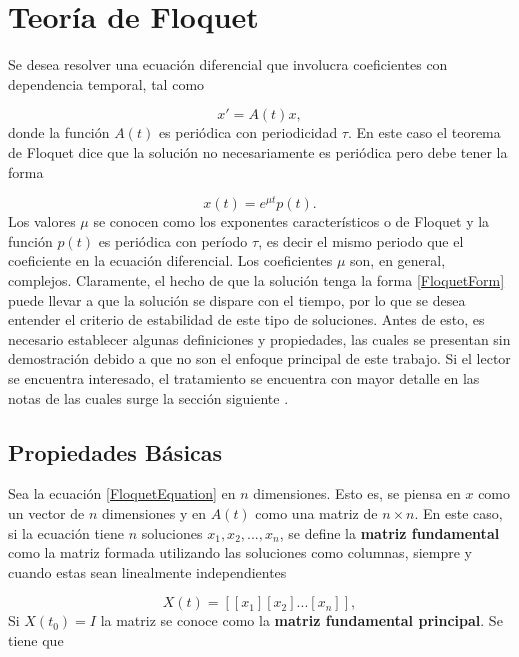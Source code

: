 \documentclass[10pt,a4paper]{report}
\begin{document}
\section{Teoría de Floquet}

Se desea resolver una ecuación diferencial que involucra coeficientes con dependencia temporal, tal como

\begin{equation}\label{FloquetEquation}
x' = A(t)x,
\end{equation} donde la función $A(t)$ es periódica con periodicidad $\tau$. En este caso el teorema de Floquet\cite{WardFT} dice que la solución no necesariamente es periódica pero debe tener la forma

\begin{equation}\label{FloquetForm}
x(t)=e^{\mu t}p(t).
\end{equation} Los valores $\mu$ se conocen como los exponentes característicos o de Floquet y la función $p(t)$ es periódica con período $\tau$, es decir el mismo periodo que el coeficiente en la ecuación diferencial. Los coeficientes $\mu$ son, en general, complejos. Claramente, el hecho de que la solución tenga la forma \eqref{FloquetForm} puede llevar a que la solución se dispare con el tiempo, por lo que se desea entender el criterio de estabilidad de este tipo de soluciones. Antes de esto, es necesario establecer algunas definiciones y propiedades, las cuales se presentan sin demostración debido a que no son el enfoque principal de este trabajo. Si el lector se encuentra interesado, el tratamiento se encuentra con mayor detalle en las notas de las cuales surge la sección siguiente \cite{WardFT}.

\subsection{Propiedades Básicas}

Sea la ecuación \eqref{FloquetEquation} en $n$ dimensiones. Esto es, se piensa en $x$ como un vector de $n$ dimensiones y en $A(t)$ como una matriz de $n \times n$. En este caso, si la ecuación tiene $n$ soluciones $x_1, x_2, ... , x_n$, se define la \textbf{matriz fundamental} como la matriz formada utilizando las soluciones como columnas, siempre y cuando estas sean linealmente independientes

\begin{equation}
X(t) = [[x_1][x_2]...[x_n]],
\end{equation}Si $X(t_0) = I$ la matriz se conoce como la \textbf{matriz fundamental principal}. Se tiene que
\end{document}
